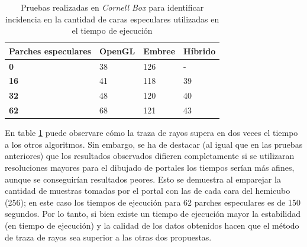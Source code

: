 \begin{table}[htbp]
	\centering
	\caption{Pruebas realizadas en \textit{Cornell Box} para identificar incidencia en la cantidad de caras especulares utilizadas en el tiempo de ejecución}
\begin{tabular}{|l|l|l|l|}
	\hline
	\multicolumn{1}{|c|}{\textbf{Parches especulares}} & \multicolumn{1}{c|}{OpenGL} & \multicolumn{1}{c|}{Embree} & \multicolumn{1}{c|}{Híbrido} \\ \hline
	\textbf{0}                              & 38                          & 126                         & -                            \\ \hline
	\textbf{16}                             & 41                          & 118                         & 39                           \\ \hline
	\textbf{32}                             & 48                          & 120                         & 40                           \\ \hline
	\textbf{62}                             & 68                          & 121                         & 43                           \\ \hline
\end{tabular}
	\label{tab:caso3}
\end{table}

En table \ref{tab:caso3} puede observare cómo la traza de rayos supera en dos veces el tiempo a los otros algoritmos. Sin embargo, se ha de destacar (al igual que en las pruebas anteriores) que los resultados observados difieren completamente si se utilizaran resoluciones mayores para el dibujado de portales los tiempos serían más afines, aunque se conseguirían resultados peores. Esto se demuestra al emparejar la cantidad de muestras tomadas por el portal con las de cada cara del hemicubo (256); en este caso los tiempos de ejecución para $62$ parches especulares es de 150 segundos. Por lo tanto, si bien existe un tiempo de ejecución mayor la estabilidad (en tiempo de ejecución) y la calidad de los datos obtenidos hacen que el método de traza de rayos sea superior a las otras dos propuestas.

